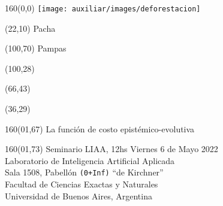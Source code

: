 \documentclass[shownotes,aspectratio=169]{beamer}
\begin{document}
\color{black!85}
\large

 

\begin{frame}


\begin{textblock}{160}(0,0)
\texttt{[image: auxiliar/images/deforestacion]}
\end{textblock}

\begin{textblock}{80}(22,10)
\textcolor{black!15}{\fontsize{44}{55}\selectfont Pacha}
\end{textblock}

\begin{textblock}{47}(100,70)
\centering \textcolor{black!15}{{\fontsize{52}{65}\selectfont Pampas}}
\end{textblock}

\begin{textblock}{80}(100,28)
\LARGE  \textcolor{black!15}{}
\end{textblock}


\begin{textblock}{80}(66,43)
\LARGE  \textcolor{black!15}{\scalebox{6}{$=$}}
\end{textblock}

\begin{textblock}{80}(36,29)
\LARGE  \textcolor{black!15}{\scalebox{9}{$p$}}
\end{textblock}

 \vspace{2cm}
\maketitle



\begin{textblock}{160}(01,67)
\normalsize \textcolor{black!5}{La función de costo epistémico-evolutiva}
\end{textblock} 

\begin{textblock}{160}(01,73)
\scriptsize \textcolor{black!5}{Seminario LIAA, 12hs Viernes 6 de Mayo 2022 \\
Laboratorio de Inteligencia Artificial Aplicada \\ 
Sala 1508, Pabellón \texttt{(0+Inf)} ``de Kirchner'' \\
Facultad de Ciencias Exactas y Naturales \\ 
Universidad de Buenos Aires, Argentina}
\end{textblock} 

\end{frame}
\end{document}
